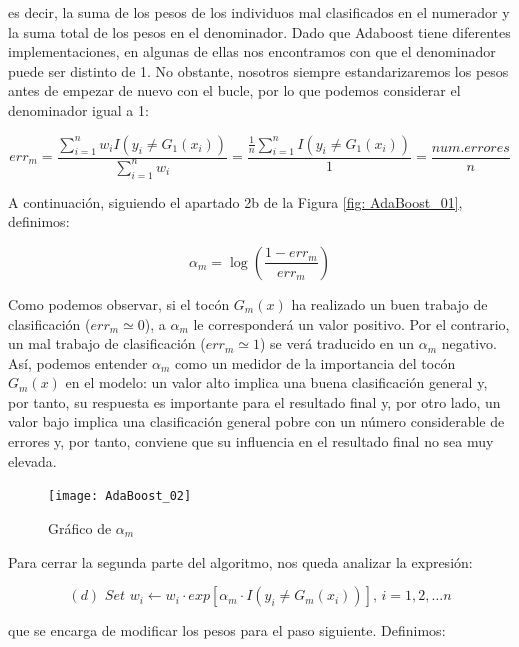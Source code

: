 \documentclass[12pt,twoside]{article}
\begin{document}
\noindent
es decir, la suma de los pesos de los individuos mal clasificados en el numerador y la suma total de los pesos en el denominador. Dado que Adaboost tiene diferentes implementaciones, en algunas de ellas nos encontramos con que el denominador puede ser distinto de 1. No obstante, nosotros siempre estandarizaremos los pesos antes de empezar de nuevo con el bucle, por lo que podemos considerar el denominador igual a 1:

\begin{equation*}
err_m = \frac{\sum_{i=1}^{n} w_i I(y_i \neq G_1(x_i))}{\sum_{i=1}^{n} w_i} = \frac{\frac{1}{n} \sum_{i=1}^{n}I(y_i \neq G_1(x_i))}{1} = \frac{num.errores}{n}
\end{equation*}

A continuación, siguiendo el apartado 2b de la Figura \ref{fig: AdaBoost_01}, definimos:

\begin{equation*}
\alpha _m = \log \left( \frac{1 - err_m}{err_m} \right)
\end{equation*}

Como podemos observar, si el tocón $G_m(x)$ ha realizado un buen trabajo de clasificación ($err_m \simeq 0$), a $\alpha_m$ le corresponderá un valor positivo. Por el contrario, un mal trabajo de clasificación ($err_m \simeq 1$) se verá traducido en un $\alpha_m$ negativo. Así, podemos entender $\alpha_m$ como un medidor de la importancia del tocón $G_m(x)$ en el modelo: un valor alto implica una buena clasificación general y, por tanto, su respuesta es importante para el resultado final y, por otro lado, un valor bajo implica una clasificación general pobre con un número considerable de errores y, por tanto, conviene que su influencia en el resultado final no sea muy elevada.

\begin{figure}[h]
\centering
\texttt{[image: AdaBoost\_02]}
\caption{Gráfico de $\alpha_m$}
\label{fig: AdaBoost_02}
\end{figure}

Para cerrar la segunda parte del algoritmo, nos queda analizar la expresión:

\begin{equation*}
(d) \, \, Set \, \, w_i \longleftarrow w_i \cdot exp[\alpha_m \cdot I(y_i \neq G_m(x_i))], \, i = 1, 2, \dots n 
\end{equation*}

\noindent
que se encarga de modificar los pesos para el paso siguiente. Definimos:
\end{document}
